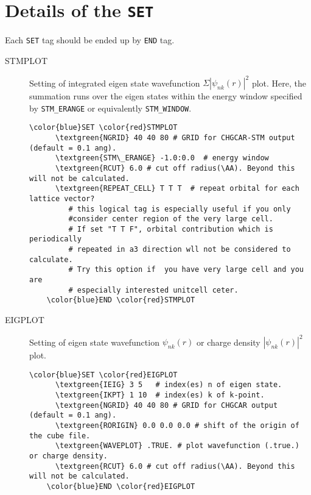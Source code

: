 \documentclass[a4paper,12pt]{scrartcl}
\makeatletter
\def\namedlabel#1#2{\begingroup
    #2%
    \def\@currentlabel{#2}%
    \phantomsection\label{#1}\endgroup
}
\newcommand{\textgreen}[1]{\textcolor{green!50!black}{\texttt{#1}}}
\makeatother
\begin{document}
\newpage

\section{Details of the \texttt{SET}}\label{tag:SET-detail}
Each \texttt{SET} tag should be ended up by \texttt{END} tag.

\begin{description}

    \item[\namedlabel{tag:STMPLOT}{STMPLOT}]
        Setting of integrated eigen state wavefunction $\Sigma |\psi_{nk}(r)|^{2}$ plot.
		Here, the summation runs over the eigen states within the energy window specified
		by \texttt{STM\_ERANGE} or equivalently \texttt{STM\_WINDOW}.

 \begin{Verbatim}[commandchars=\\\{\},gobble=4, frame=single, framesep=2mm, 
    label= STMPLOT setup example,
    labelposition=bottomline]
    \color{blue}SET \color{red}STMPLOT
      \textgreen{NGRID} 40 40 80 # GRID for CHGCAR-STM output (default = 0.1 ang).
      \textgreen{STM\_ERANGE} -1.0:0.0  # energy window
      \textgreen{RCUT} 6.0 # cut off radius(\AA). Beyond this will not be calculated.
      \textgreen{REPEAT_CELL} T T T  # repeat orbital for each lattice vector?
         # this logical tag is especially useful if you only 
         #consider center region of the very large cell.
         # If set "T T F", orbital contribution which is periodically 
         # repeated in a3 direction wll not be considered to calculate. 
         # Try this option if  you have very large cell and you are 
         # especially interested unitcell ceter.
    \color{blue}END \color{red}STMPLOT
 \end{Verbatim}

    \item[\namedlabel{tag:EIGPLOT}{EIGPLOT}]
        Setting of eigen state wavefunction $\psi_{nk}(r)$ or 
		charge density $|\psi_{nk}(r)|^{2}$ plot.

 \begin{Verbatim}[commandchars=\\\{\},gobble=4, frame=single, framesep=2mm, 
    label= EIGPLOT setup example,
    labelposition=bottomline]
    \color{blue}SET \color{red}EIGPLOT
      \textgreen{IEIG} 3 5   # index(es) n of eigen state.
      \textgreen{IKPT} 1 10  # index(es) k of k-point.
      \textgreen{NGRID} 40 40 80 # GRID for CHGCAR output (default = 0.1 ang).
      \textgreen{RORIGIN} 0.0 0.0 0.0 # shift of the origin of the cube file.
      \textgreen{WAVEPLOT} .TRUE. # plot wavefunction (.true.) or charge density.
      \textgreen{RCUT} 6.0 # cut off radius(\AA). Beyond this will not be calculated.
    \color{blue}END \color{red}EIGPLOT
 \end{Verbatim}



\end{description}
\end{document}

